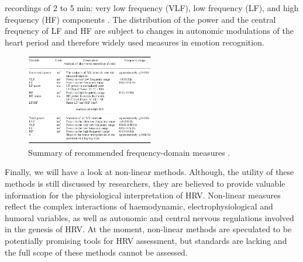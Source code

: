 recordings of 2 to 5 min: very low frequency (VLF), low frequency (LF), and high frequency (HF) components \cite{TheEuropeanSocietyofCardiology1996}. The distribution of the power and the central frequency of LF and HF are subject to changes in autonomic modulations of the heart period and therefore widely used measures in emotion recognition. 
\begin{figure}[ht]
	\centering
  \includegraphics[width=0.5\textwidth, angle=0]{images/SelectedFrequencyDomainMeasures.jpg}
	\caption[Selected frequency-domain measures of HRV]{Summary of recommended frequency-domain measures \cite{TheEuropeanSocietyofCardiology1996}. }
	\label{tdf}
\end{figure}
Finally, we will have a look at non-linear methods. Although, the utility of these methods is still discussed by researchers, they are believed to provide valuable information for the physiological interpretation of HRV. Non-linear measures reflect the complex interactions of haemodynamic, electrophysiological and humoral variables, as well as autonomic and central
nervous regulations involved in the genesis of HRV. At the moment, non-linear methods are speculated to be potentially promising tools for HRV assessment, but standards are lacking and the full scope of these methods cannot be assessed.


